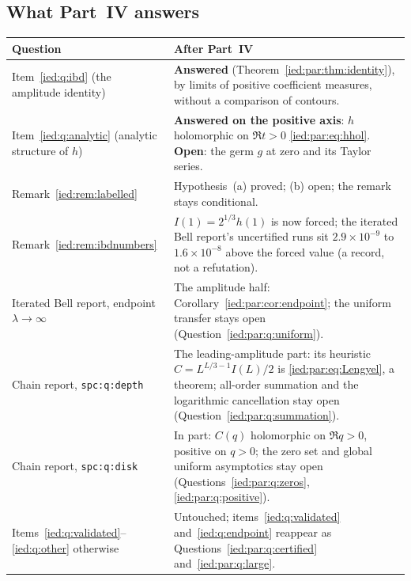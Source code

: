 \documentclass[11pt,letterpaper]{article}
\theoremstyle{remark}\newtheorem{remark}[theorem]{Remark}
\newcommand{\file}[1]{\nolinkurl{#1}}
\begin{document}
\subsection{What Part~IV answers}\label{ied:par:sec:answers}

\begingroup\small
\renewcommand{\arraystretch}{1.12}
\renewcommand{\theHtable}{iedpar.answers}%
\begin{longtable}{@{}>{\raggedright\arraybackslash}p{}>{\raggedright\arraybackslash}p{}@{}}
\toprule
Question & After Part~IV\\
\midrule
\endhead
Item~\ref{ied:q:ibd} (the amplitude identity) & \textbf{Answered} (Theorem~\ref{ied:par:thm:identity}), by limits of positive coefficient measures, without a comparison of contours.\\
Item~\ref{ied:q:analytic} (analytic structure of $h$) & \textbf{Answered on the positive axis}: $h$ holomorphic on $\Re t>0$ \eqref{ied:par:eq:hhol}. \textbf{Open}: the germ $g$ at zero and its Taylor series.\\
Remark~\ref{ied:rem:labelled} & Hypothesis~(a) proved; (b) open; the remark stays conditional.\\
Remark~\ref{ied:rem:ibdnumbers} & $I(1)=2^{1/3}h(1)$ is now forced; the iterated Bell report's uncertified runs sit $2.9\times10^{-9}$ to $1.6\times10^{-8}$ above the forced value (a record, not a refutation).\\
Iterated Bell report, endpoint $\lambda\to\infty$ & The amplitude half: Corollary~\ref{ied:par:cor:endpoint}; the uniform transfer stays open (Question~\ref{ied:par:q:uniform}).\\
Chain report, \file{spc:q:depth} & The leading-amplitude part: its heuristic $C=L^{L/3-1}I(L)/2$ is \eqref{ied:par:eq:Lengyel}, a theorem; all-order summation and the logarithmic cancellation stay open (Question~\ref{ied:par:q:summation}).\\
Chain report, \file{spc:q:disk} & In part: $C(q)$ holomorphic on $\Re q>0$, positive on $q>0$; the zero set and global uniform asymptotics stay open (Questions~\ref{ied:par:q:zeros}, \ref{ied:par:q:positive}).\\
Items~\ref{ied:q:validated}--\ref{ied:q:other} otherwise & Untouched; items~\ref{ied:q:validated} and~\ref{ied:q:endpoint} reappear as Questions~\ref{ied:par:q:certified} and~\ref{ied:par:q:large}.\\
\bottomrule
\end{longtable}
\addtocounter{table}{-1}%
\endgroup
\end{document}
